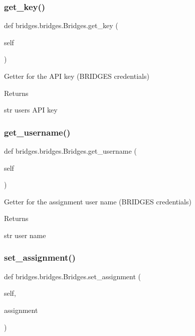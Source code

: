 \subsubsection{\texorpdfstring{get\_key()}{get\_key()}}
{\footnotesize\ttfamily def bridges.\+bridges.\+Bridges.\+get\+\_\+key (\begin{DoxyParamCaption}\item[{}]{self }\end{DoxyParamCaption})}



Getter for the A\+PI key (B\+R\+I\+D\+G\+ES credentials) 

\begin{DoxyReturn}{Returns}


str user\textquotesingle{}s A\+PI key 
\end{DoxyReturn}
\mbox{\label{classbridges_1_1bridges_1_1_bridges_abf6fdb19db336c2ed14987fdd89d65fe}} 
\subsubsection{\texorpdfstring{get\_username()}{get\_username()}}
{\footnotesize\ttfamily def bridges.\+bridges.\+Bridges.\+get\+\_\+username (\begin{DoxyParamCaption}\item[{}]{self }\end{DoxyParamCaption})}



Getter for the assignment user name (B\+R\+I\+D\+G\+ES credentials) 

\begin{DoxyReturn}{Returns}


str user name 
\end{DoxyReturn}
\mbox{\label{classbridges_1_1bridges_1_1_bridges_add46441bec1c93095c48adc724b90e12}} 
\subsubsection{\texorpdfstring{set\_assignment()}{set\_assignment()}}
{\footnotesize\ttfamily def bridges.\+bridges.\+Bridges.\+set\+\_\+assignment (\begin{DoxyParamCaption}\item[{}]{self,  }\item[{}]{assignment }\end{DoxyParamCaption})}




